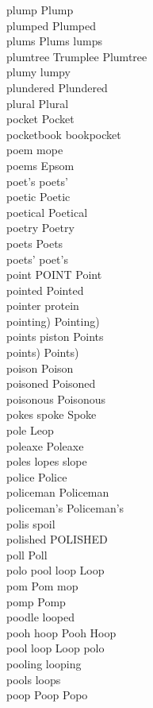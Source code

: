 plump Plump\\
plumped Plumped\\
plums Plums lumps\\
plumtree Trumplee Plumtree\\
plumy lumpy\\
plundered Plundered\\
plural Plural\\
pocket Pocket\\
pocketbook bookpocket\\
poem mope\\
poems Epsom\\
poet's poets'\\
poetic Poetic\\
poetical Poetical\\
poetry Poetry\\
poets Poets\\
poets' poet's\\
point POINT Point\\
pointed Pointed\\
pointer protein\\
pointing) Pointing)\\
points piston Points\\
points) Points)\\
poison Poison\\
poisoned Poisoned\\
poisonous Poisonous\\
pokes spoke Spoke\\
pole Leop\\
poleaxe Poleaxe\\
poles lopes slope\\
police Police\\
policeman Policeman\\
policeman's Policeman's\\
polis spoil\\
polished POLISHED\\
poll Poll\\
polo pool loop Loop\\
pom Pom mop\\
pomp Pomp\\
poodle looped\\
pooh hoop Pooh Hoop\\
pool loop Loop polo\\
pooling looping\\
pools loops\\
poop Poop Popo\\
